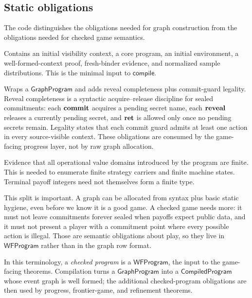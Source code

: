 \subsection{Static obligations}
\label{sec:source:wf}

The code distinguishes the obligations needed for graph construction
from the obligations needed for checked game semantics.

\begin{description}[itemsep=2pt,leftmargin=1.2em,style=nextline]
\item[\(\mathsf{GraphProgram}\).]
  Contains an initial visibility context, a core program, an initial
  environment, a well-formed-context proof, fresh-binder evidence, and
  normalized sample distributions.  This is the minimal input to
  \(\mathsf{compile}\).
\item[\(\mathsf{WFProgram}\).]
  Wraps a \(\mathsf{GraphProgram}\) and adds reveal completeness plus
  commit-guard legality.  Reveal completeness is a syntactic
  acquire--release discipline for sealed commitments: each \(\mathbf{commit}\)
  acquires a pending secret name, each \(\mathbf{reveal}\) releases a currently
  pending secret, and \(\mathbf{ret}\) is allowed only once no pending secrets
  remain.  Legality states that each commit guard admits at least one
  action in every source-visible context.  These obligations are consumed
  by the game-facing progress layer, not by raw graph allocation.
\item[\(\mathsf{FiniteDomains}\).]
  Evidence that all operational value domains introduced by the program
  are finite.  This is needed to enumerate finite strategy carriers and
  finite machine states.  Terminal payoff integers need not themselves
  form a finite type.
\end{description}

This split is important.  A graph can be allocated from syntax plus
basic static hygiene, even before we know it is a good game.  A checked
game needs more: it must not leave commitments forever sealed
when payoffs expect public data, and it must not present a player with a
commitment point where every possible action is illegal.  Those are
semantic obligations about play, so they live in \(\mathsf{WFProgram}\)
rather than in the graph row format.

In this terminology, a \emph{checked program} is a
\(\mathsf{WFProgram}\), the input to the game-facing theorems.
Compilation turns a \(\mathsf{GraphProgram}\) into a
\(\mathsf{CompiledProgram}\) whose event graph is well formed; the
additional checked-program obligations are then used by progress,
frontier-game, and refinement theorems.

